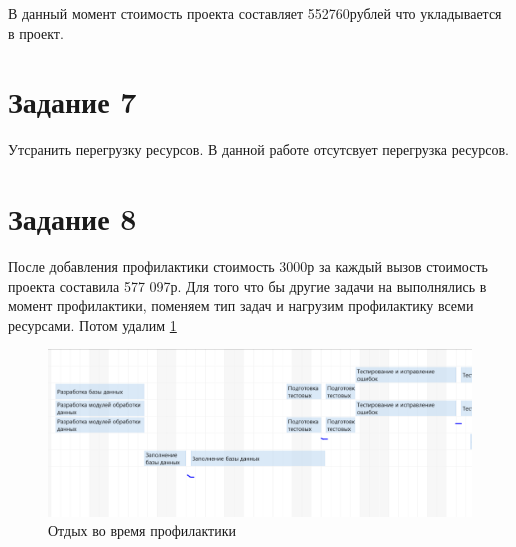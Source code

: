 В данный момент стоимость проекта составляет 552760рублей что укладывается в проект.

\section{Задание 7}
Утсранить перегрузку ресурсов.
В данной работе отсутсвует перегрузка ресурсов.

\section{Задание 8}
После добавления профилактики стоимость 3000р за каждый вызов стоимость проекта составила 577 097р.
Для того что бы другие задачи на выполнялись в момент профилактики, поменяем тип задач и нагрузим профилактику всеми ресурсами.
Потом удалим \ref{fig:13}
\begin{figure}[H]
	\centering
	\includegraphics[width=0.7\linewidth]{src/13}
	\caption{Отдых во время профилактики}
	\label{fig:13}
\end{figure}























